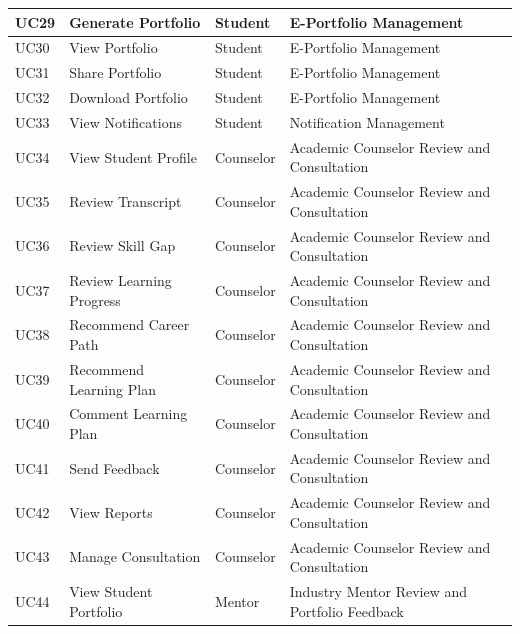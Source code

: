 \begin{longtable}{|>{\centering\arraybackslash}m{0.8cm}|>{\raggedright\arraybackslash}m{3.0cm}|>{\raggedright\arraybackslash}m{2.4cm}|>{\raggedright\arraybackslash}m{4.8cm}|}
UC29 & Generate Portfolio & Student & E-Portfolio Management \\
\hline

UC30 & View Portfolio & Student & E-Portfolio Management \\
\hline

UC31 & Share Portfolio & Student & E-Portfolio Management \\
\hline

UC32 & Download Portfolio & Student & E-Portfolio Management \\
\hline

UC33 & View Notifications & Student & Notification Management \\
\hline

UC34 & View Student Profile & Counselor & Academic Counselor Review and Consultation \\
\hline

UC35 & Review Transcript & Counselor & Academic Counselor Review and Consultation \\
\hline

UC36 & Review Skill Gap & Counselor & Academic Counselor Review and Consultation \\
\hline

UC37 & Review Learning Progress & Counselor & Academic Counselor Review and Consultation \\
\hline

UC38 & Recommend Career Path & Counselor & Academic Counselor Review and Consultation \\
\hline

UC39 & Recommend Learning Plan & Counselor & Academic Counselor Review and Consultation \\
\hline

UC40 & Comment Learning Plan & Counselor & Academic Counselor Review and Consultation \\
\hline

UC41 & Send Feedback & Counselor & Academic Counselor Review and Consultation \\
\hline

UC42 & View Reports & Counselor & Academic Counselor Review and Consultation \\
\hline

UC43 & Manage Consultation & Counselor & Academic Counselor Review and Consultation \\
\hline

UC44 & View Student Portfolio & Mentor & Industry Mentor Review and Portfolio Feedback \\
\hline


\end{longtable}
